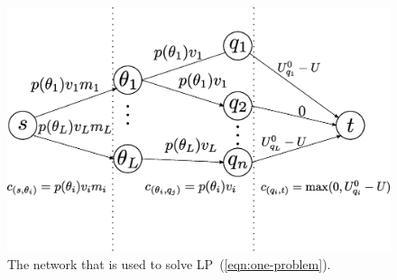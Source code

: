 \documentclass{article}
\begin{document}
\begin{figure}
\caption{The network that is used to solve LP~(\ref{eqn:one-problem}).}
\label{fig:network}
\includegraphics[trim=0 40mm 0 10mm, clip, width=\linewidth]{network}
\end{figure}
\end{document}
